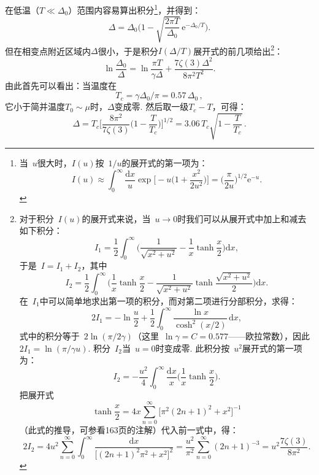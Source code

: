 在低温（$T\ll\Delta_0$）范围内容易算出积分\footnote{当~$u$很大时，$I(u)$按~$1/u$的展开式的第一项为：
\begin{equation*}
I(u)\approx\int_0^{\infty}\frac{\mathrm dx}{u}\exp\Biggl[-u\Biggl(1+\frac{x^2}{2u^2}\Biggr)\Biggr]=\Biggl(\frac{\pi}{2u}\Biggr)^{\!1/2}\mathrm e^{-u}.
\end{equation*}}，并得到：
\begin{equation}
\Delta = \Delta_0\Biggl(1 - \sqrt{\frac{2\pi T}{\Delta_0}}\,\mathrm e^{-\Delta_0/T}\Biggr).
\label{40.2}
\end{equation}
但在相变点附近区域内$\Delta$很小，于是积分$I(\Delta/T)$展开式的前几项给出\footnote{对于积分~$I(u)$的展开式来说，当~$u\to0$时我们可以从展开式中加上和减去如下积分：
\begin{equation*}
I_1=\frac{1}{2}\int_0^{\infty}\Biggl(\frac{1}{\sqrt{x^2+u^2}}-\frac{1}{x}\tanh\frac{x}{2}\Biggr)\mathrm dx,
\end{equation*}
于是~$I=I_1+I_2$，其中
\begin{equation*}
I_2=\frac{1}{2}\int_0^{\infty}\Biggl(\frac{1}{x}\tanh\frac{x}{2}-\frac{1}{\sqrt{x^2+u^2}}\tanh\frac{\sqrt{x^2+u^2}}{2}\Biggr)\mathrm dx.
\end{equation*}
在~$I_1$中可以简单地求出第一项的积分，而对第二项进行分部积分，求得：
\begin{equation*}
2I_1=-\ln\frac{u}{2}+\frac{1}{2}\int_0^{\infty}\frac{\ln x}{\cosh^2(x/2)}\,\mathrm dx,
\end{equation*}
式中的积分等于~$2\ln(\pi/2\gamma)$（这里~$\ln\gamma=C=0.577$——欧拉常数），因此~$2I_1=\ln(\pi/\gamma u)$.
积分~$I_2$当~$u=0$时变成零. 此积分按~$u^2$展开式的第一项为：
\begin{equation*}
I_2=-\frac{u^2}{4}\int_0^{\infty}\frac{\mathrm dx}{x}\Biggl(\frac{1}{x}\tanh\frac{x}{2}\Biggr).
\end{equation*}
把展开式
\begin{equation*}
\tanh\frac{x}{2}=4x\sum_{n=0}^{\infty}\bigl[\pi^2(2n+1)^2+x^2\bigr]^{-1}
\end{equation*}
（此式的推导，可参看163页的注解）代入前一式中，得：
\begin{equation*}
2I_2=4u^2\sum_{n=0}^{\infty}\int_0^{\infty}\frac{\mathrm dx}{\bigl[(2n+1)^2\pi^2+x^2\bigr]^2}
=\frac{u^2}{\pi^2}\sum_{n=0}^{\infty}(2n+1)^{-3}=u^2\frac{7\zeta(3)}{8\pi^2}.
\end{equation*}}：
\begin{equation}
\ln\frac{\Delta_0}{\Delta} = \ln\frac{\pi T}{\gamma\Delta} + \frac{7\zeta(3)\Delta^2}{8\pi^2T^2}.
\label{40.3}
\end{equation}
由此首先可以看出：当温度在
\begin{equation}
T_c = \gamma\Delta_0/\pi = 0.57\,\Delta_0\,,
\label{40.4}
\end{equation}
它小于简并温度$T_0\sim\mu$时，$\Delta$变成零. 然后取一级$T_c-T$，可得：
\begin{equation}
\Delta = T_c\Biggl[\frac{8\pi^2}{7\zeta(3)}\Biggl(1-\frac{T}{T_c}\Biggr)\Biggr]^{1/2}
= 3.06\,T_c\sqrt{1-\frac{T}{T_c}}\,.
\label{40.5}
\end{equation}

